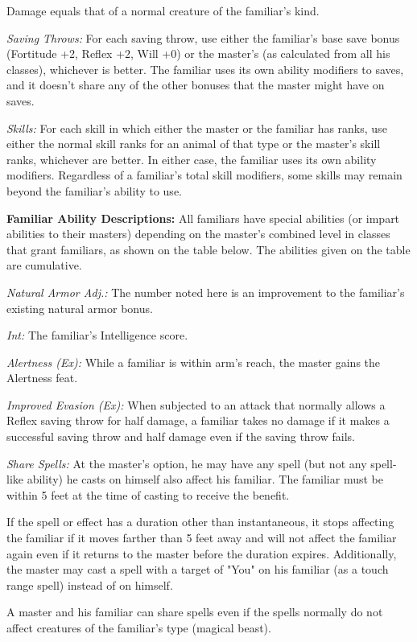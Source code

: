 Damage equals that of a normal creature of the familiar's kind.

\textit{Saving Throws:} For each saving throw, use either the familiar's base save bonus (Fortitude +2, Reflex +2, Will +0) or the master's (as calculated from all his classes), whichever is better. The familiar uses its own ability modifiers to saves, and it doesn't share any of the other bonuses that the master might have on saves.

\textit{Skills:} For each skill in which either the master or the familiar has ranks, use either the normal skill ranks for an animal of that type or the master's skill ranks, whichever are better. In either case, the familiar uses its own ability modifiers. Regardless of a familiar's total skill modifiers, some skills may remain beyond the familiar's ability to use.

\textbf{Familiar Ability Descriptions:} All familiars have special abilities (or impart abilities to their masters) depending on the master's combined level in classes that grant familiars, as shown on the table below. The abilities given on the table are cumulative. 

\textit{Natural Armor Adj.:} The number noted here is an improvement to the familiar's existing natural armor bonus.

\textit{Int:} The familiar's Intelligence score.

\textit{Alertness (Ex):} While a familiar is within arm's reach, the master gains the Alertness feat.

\textit{Improved Evasion (Ex):} When subjected to an attack that normally allows a Reflex saving throw for half damage, a familiar takes no damage if it makes a successful saving throw and half damage even if the saving throw fails.

\textit{Share Spells:} At the master's option, he may have any spell (but not any spell-like ability) he casts on himself also affect his familiar. The familiar must be within 5 feet at the time of casting to receive the benefit.

If the spell or effect has a duration other than instantaneous, it stops affecting the familiar if it moves farther than 5 feet away and will not affect the familiar again even if it returns to the master before the duration expires. Additionally, the master may cast a spell with a target of "You" on his familiar (as a touch range spell) instead of on himself.

A master and his familiar can share spells even if the spells normally do not affect creatures of the familiar's type (magical beast).

